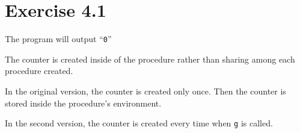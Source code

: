 \section{Exercise 4.1}

The program will output ``\texttt{0}''

The counter is created inside of the procedure
rather than sharing among each procedure created.

In the original version, the counter is created only once.
Then the counter is stored
inside the procedure's environment.

In the second version, the counter is created every time
when \texttt{g} is called.
